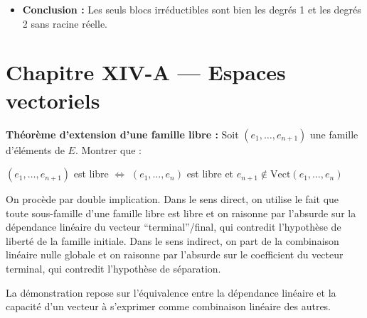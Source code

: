 \documentclass[11pt, a4paper]{article}
\theoremstyle{definition}
\begin{document}
\begin{itemize}
\begin{itemize}
\begin{itemize}
	\item On développe ce produit de facteurs conjugués : $(X-z)(X-\bar{z}) = X^2 - 2\text{Re}(z)X + |z|^2$.
	\item Ce polynôme est de degré 2 et possède des coefficients strictement réels. On a donc trouvé un facteur réel propre de degré 2 qui divise $P$ (car $\deg(P) \ge 3$). Par conséquent, $P$ est réductible.
\end{itemize}
\end{itemize}
\[
(X-z)(X-\bar{z}) \mid P
\]
\item \textbf{Conclusion :} Les seuls blocs irréductibles sont bien les degrés 1 et les degrés 2 sans racine réelle.
\end{itemize}

\clearpage


\section{Chapitre XIV-A --- Espaces vectoriels}

\begin{tcolorbox}[instructionstyle]


\textbf{Théorème d'extension d'une famille libre :} Soit $(e_1, \dots, e_{n+1})$ une famille d'éléments de $E$. Montrer que :

$(e_1, \dots, e_{n+1})$ est libre $\iff$ $(e_1, \dots, e_n)$ est libre et $e_{n+1} \notin \text{Vect}(e_1, \dots, e_n)$
\end{tcolorbox}

\begin{tcolorbox}[methodstyle]
  On procède par double implication. Dans le sens direct, on utilise le fait que toute sous-famille d'une famille libre est libre et on raisonne par l'absurde sur la dépendance linéaire du vecteur ``terminal''/final, qui contredit l'hypothèse de liberté de la famille initiale. Dans le sens indirect, on part de la combinaison linéaire nulle globale et on raisonne par l'absurde sur le coefficient du vecteur terminal, qui contredit l'hypothèse de séparation.
\end{tcolorbox}

La démonstration repose sur l'équivalence entre la dépendance linéaire et la capacité d'un vecteur à s'exprimer comme combinaison linéaire des autres.
\end{document}
